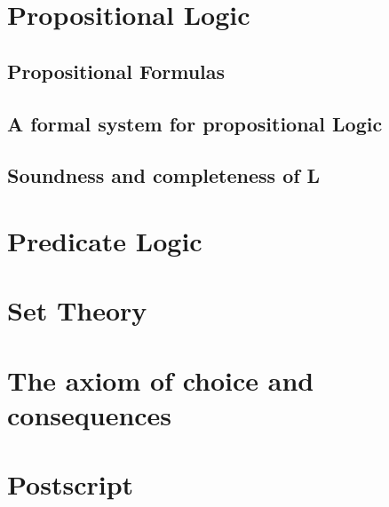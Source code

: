\documentclass[a4paper]{article}
\begin{document}
\section{Propositional Logic}
\subsection{Propositional Formulas}
\subsection{A formal system for propositional Logic}
\subsection{Soundness and completeness of L}
\section{Predicate Logic}
\section{Set Theory}
\section{The axiom of choice and consequences}
\section{Postscript}
\end{document}
